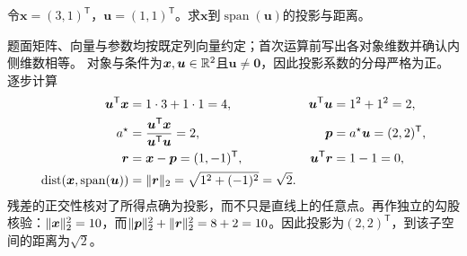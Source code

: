 \begin{example}[二维投影与残差]\label{exm:V1-C02-projection}\label{schema:V1-C02:CH-18}\label{schema:V1-C02:CH-32}
令$\boldsymbol{x}=(3,1)^{\mathsf T}$，$\boldsymbol{u}=(1,1)^{\mathsf T}$。求$\boldsymbol{x}$到$\operatorname{span}(\boldsymbol{u})$的投影与距离。
\end{example}
\label{schema:V1-C02:CH-33}
\begin{solution}
\SolGiven 题面矩阵、向量与参数均按既定列向量约定；首次运算前写出各对象维数并确认内侧维数相等。
\SolDerive
对象与条件为$\boldsymbol{x},\boldsymbol{u}\in\mathbb{R}^2$且$\boldsymbol{u}\ne\boldsymbol0$，因此投影系数的分母严格为正。逐步计算
\[
\begin{aligned}
\boldsymbol{u}^{\mathsf T}\boldsymbol{x}&=1\cdot3+1\cdot1=4,
&\boldsymbol{u}^{\mathsf T}\boldsymbol{u}&=1^2+1^2=2,\\
a^\star&=\frac{\boldsymbol{u}^{\mathsf T}\boldsymbol{x}}
{\boldsymbol{u}^{\mathsf T}\boldsymbol{u}}=2,
&\boldsymbol{p}&=a^\star\boldsymbol{u}=(2,2)^{\mathsf T},\\
\boldsymbol{r}&=\boldsymbol{x}-\boldsymbol{p}=(1,-1)^{\mathsf T},
&\boldsymbol{u}^{\mathsf T}\boldsymbol{r}&=1-1=0,\\
\operatorname{dist}(\boldsymbol{x},\operatorname{span}(\boldsymbol{u}))
&=\lVert\boldsymbol r\rVert_2=\sqrt{1^2+(-1)^2}=\sqrt2.
\end{aligned}
\]
残差的正交性核对了所得点确为投影，而不只是直线上的任意点。再作独立的勾股核验：$\lVert\boldsymbol x\rVert_2^2=10$，而$\lVert\boldsymbol p\rVert_2^2+\lVert\boldsymbol r\rVert_2^2=8+2=10$。因此投影为$(2,2)^{\mathsf T}$，到该子空间的距离为$\sqrt2$。
\end{solution}


